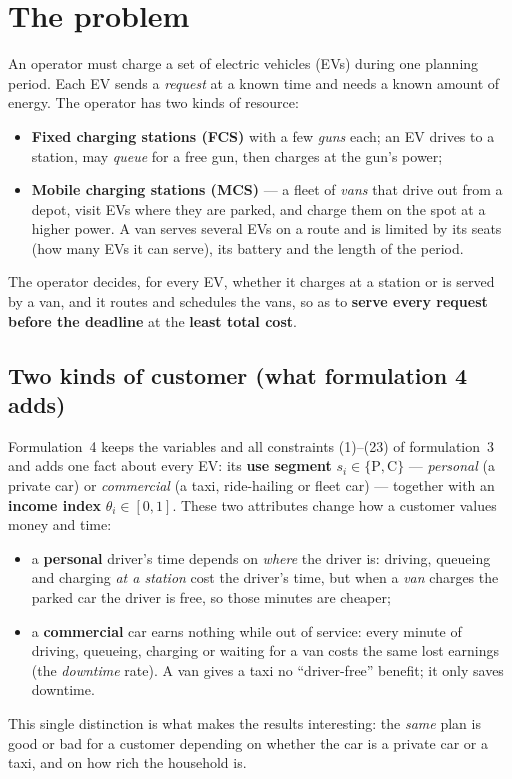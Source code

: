 \section{The problem}
\label{sec:intro}

An operator must charge a set of electric vehicles (EVs) during one planning period. Each EV sends a
\emph{request} at a known time and needs a known amount of energy. The operator has two kinds of resource:
\begin{itemize}
  \item \textbf{Fixed charging stations (FCS)} with a few \emph{guns} each; an EV drives to a station, may
  \emph{queue} for a free gun, then charges at the gun's power;
  \item \textbf{Mobile charging stations (MCS)} --- a fleet of \emph{vans} that drive out from a depot, visit
  EVs where they are parked, and charge them on the spot at a higher power. A van serves several EVs on a route
  and is limited by its seats (how many EVs it can serve), its battery and the length of the period.
\end{itemize}
The operator decides, for every EV, whether it charges at a station or is served by a van, and it routes and
schedules the vans, so as to \textbf{serve every request before the deadline} at the \textbf{least total cost}.

\subsection{Two kinds of customer (what formulation 4 adds)}

Formulation~4 keeps the variables and all constraints (1)--(23) of formulation~3 and adds one fact about every
EV: its \textbf{use segment} $s_i\in\{\mathrm P,\mathrm C\}$ --- \emph{personal} (a private car) or
\emph{commercial} (a taxi, ride-hailing or fleet car) --- together with an \textbf{income index}
$\theta_i\in[0,1]$. These two attributes change how a customer values money and time:
\begin{itemize}
  \item a \textbf{personal} driver's time depends on \emph{where} the driver is: driving, queueing and charging
  \emph{at a station} cost the driver's time, but when a \emph{van} charges the parked car the driver is free,
  so those minutes are cheaper;
  \item a \textbf{commercial} car earns nothing while out of service: every minute of driving, queueing,
  charging or waiting for a van costs the same lost earnings (the \emph{downtime} rate). A van gives a taxi no
  ``driver-free'' benefit; it only saves downtime.
\end{itemize}
This single distinction is what makes the results interesting: the \emph{same} plan is good or bad for a
customer depending on whether the car is a private car or a taxi, and on how rich the household is.

